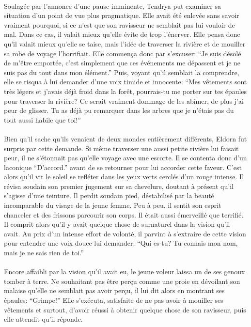 \paragraph{}
Soulagée par l'annonce d'une pause imminente, Tendrya put examiner sa
situation d'un point de vue plus pragmatique. Elle avait été enlevée sans
savoir vraiment pourquoi, si ce n'est que son ravisseur ne semblait pas lui
vouloir de mal. Dans ce cas, il valait mieux qu'elle évite de trop l'énerver.
Elle pensa donc qu'il valait mieux qu'elle se taise, mais l'idée de traverser
la rivière et de mouiller sa robe de voyage l'horrifiait. Elle commença donc
par s'excuser: ``Je suis désolé de m'être emportée, c'est simplement que ces
événements me dépassent et je ne suis pas du tout dans mon élément.'' Puis,
voyant qu'il semblait la comprendre, elle se risqua à lui demander d'une voix
timide et innocente: ``Mes vêtements sont très légers et j'avais déjà froid
dans la forêt, pourrais-tu me porter sur tes épaules pour traverser la
rivière? Ce serait vraiment dommage de les abîmer, de plus j'ai peur de
glisser. Tu as déjà pu remarquer dans les arbres que je n'étais pas du tout
aussi habile que toi!''

\paragraph{}
Bien qu'il sache qu'ils venaient de deux mondes entièrement différents, Eldorn
fut surpris par cette demande. Si même traverser une aussi petite rivière lui
faisait peur, il ne s'étonnait pas qu'elle voyage avec une escorte. Il se
contenta donc d'un laconique ``D'accord.'' avant de se retourner pour lui
accorder cette faveur. C'est alors qu'il vit le soleil se refléter dans les
yeux verts cerclés d'un rouge intense. Il révisa soudain son premier jugement
sur sa chevelure, doutant à présent qu'il s'agisse d'une teinture. Il perdit
soudain pied, déstabilisé par la beauté incomparable du visage de la jeune
femme. Peu à peu, il sentit son esprit chanceler et des frissons parcourir son
corps. Il était aussi émerveillé que terrifié. Il comprit alors qu'il y avait
quelque chose de surnaturel dans la vision qu'il avait. Au prix d'un intense
effort de volonté, il parvint à s'extraire de cette vision pour entendre une
voix douce lui demander: ``Qui es-tu? Tu connais mon nom, mais je ne sais rien
de toi.''

\paragraph{}
Encore affaibli par la vision qu'il avait eu, le jeune voleur laissa un de ses
genoux tomber à terre. Ne souhaitant pas être perçu comme une proie en
dévoilant son malaise qu'elle ne semblait pas avoir perçu, il lui dit alors en
montrant ses épaules: ``Grimpe!'' Elle s'exécuta, satisfaite de ne pas avoir
à mouiller ses vêtements et surtout, d'avoir réussi à obtenir quelque chose de
son ravisseur, puis elle attendit qu'il réponde.

